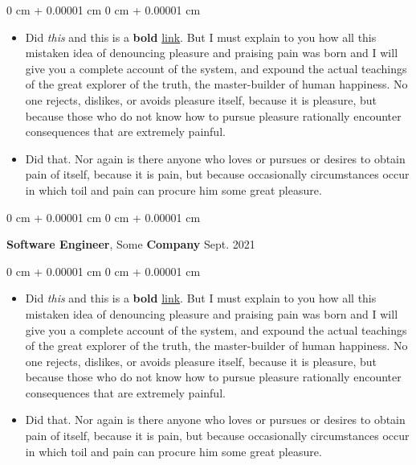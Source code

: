 \documentclass[10pt, letterpaper]{article}
\newenvironment{highlights}{
    \begin{itemize}[
        topsep=0.10 cm,
        parsep=0.10 cm,
        partopsep=0pt,
        itemsep=0pt,
        leftmargin=0 cm + 10pt
    ]
}{
    \end{itemize}
} %
\newenvironment{onecolentry}{
    \begin{adjustwidth}{
        0 cm + 0.00001 cm
    }{
        0 cm + 0.00001 cm
    }
}{
    \end{adjustwidth}
} %
\newenvironment{twocolentry}[2][]{
    \onecolentry
    \def\secondColumn{#2}
    \setcolumnwidth{\fill, 4.5 cm}
    \begin{paracol}{2}
}{
    \switchcolumn \raggedleft \secondColumn
    \end{paracol}
    \endonecolentry
} %
\begin{document}
        \vspace{0.10 cm}
        \begin{onecolentry}
            \begin{highlights}
                \item Did \textit{this} and this is a \textbf{bold} \href{https://example.com}{link}. But I must explain to you how all this mistaken idea of denouncing pleasure and praising pain was born and I will give you a complete account of the system, and expound the actual teachings of the great explorer of the truth, the master-builder of human happiness. No one rejects, dislikes, or avoids pleasure itself, because it is pleasure, but because those who do not know how to pursue pleasure rationally encounter consequences that are extremely painful.
                \item Did that. Nor again is there anyone who loves or pursues or desires to obtain pain of itself, because it is pain, but because occasionally circumstances occur in which toil and pain can procure him some great pleasure.
            \end{highlights}
        \end{onecolentry}


        \vspace{0.2 cm}

        \begin{twocolentry}{
            Sept. 2021
        }
            \textbf{Software Engineer}, Some \textbf{Company}\end{twocolentry}

        \vspace{0.10 cm}
        \begin{onecolentry}
            \begin{highlights}
                \item Did \textit{this} and this is a \textbf{bold} \href{https://example.com}{link}. But I must explain to you how all this mistaken idea of denouncing pleasure and praising pain was born and I will give you a complete account of the system, and expound the actual teachings of the great explorer of the truth, the master-builder of human happiness. No one rejects, dislikes, or avoids pleasure itself, because it is pleasure, but because those who do not know how to pursue pleasure rationally encounter consequences that are extremely painful.
                \item Did that. Nor again is there anyone who loves or pursues or desires to obtain pain of itself, because it is pain, but because occasionally circumstances occur in which toil and pain can procure him some great pleasure.
            \end{highlights}
        \end{onecolentry}
\end{document}
